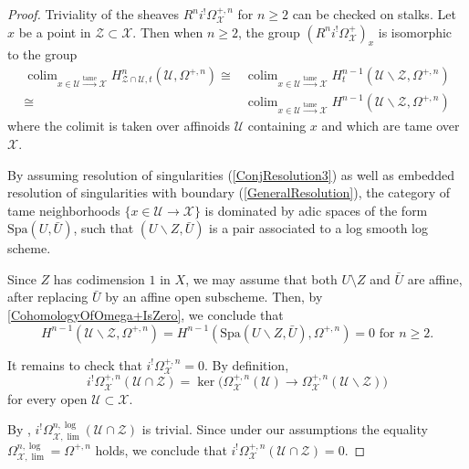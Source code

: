 \documentclass{amsart}
\def\Spa{\textrm{Spa}}
\theoremstyle{definition}
\DeclareMathOperator*{\colim}{\mathrm{colim}}
\numberwithin{equation}{section}
\begin{document}
\begin{proof}
	Triviality of the sheaves $R^ni^!\Omega^{+,n}_{\mathcal{X}}$ for $n\geq 2$ can be checked on stalks. Let $x$ be a point in $\mathcal{Z}\subset\mathcal{X}$. Then when $n\geq 2$, the group $(R^ni^!\Omega^+_{\mathcal{X}})_x$ is isomorphic to the group
	\[
	\begin{split}
		\colim_{x\in\mathcal{U}\xrightarrow{\textrm{tame}} \mathcal{X}}H^n_{\mathcal{Z}\cap \mathcal{U}, t}(\mathcal{U},\Omega^{+,n})\cong &\colim_{x\in \mathcal{U}\xrightarrow{\textrm{tame}} \mathcal{X}}H^{n-1}_{t}(\mathcal{U}\backslash\mathcal{Z},\Omega^{+,n})\\ \cong&\colim_{x\in \mathcal{U}\xrightarrow{\textrm{tame}} \mathcal{X}}H^{n-1}(\mathcal{U}\backslash\mathcal{Z},\Omega^{+,n}) 
	\end{split}
\]
	where the colimit is taken over affinoids $\mathcal{U}$ containing $x$ and which are tame over $\mathcal{X}$.
	
	By assuming resolution of singularities (\cref{ConjResolution3}) as well as embedded resolution of singularities with boundary (\cref{GeneralResolution}), the category of tame neighborhoods $\{x\in \mathcal{U}\to \mathcal{X}\}$ is dominated by adic spaces of the form $\Spa(U,\bar{U})$, such that $(U\backslash Z,\bar{U})$ is a pair associated to a log smooth log scheme.
	
	
	 Since $Z$ has codimension $1$ in $X$, we may assume that both \( U \setminus Z \) and \( \bar{U} \) are affine, after replacing \( \bar{U} \) by an affine open subscheme. Then, by \cref{CohomologyOfOmega+IsZero}, we conclude that
	 $$H^{n-1}(\mathcal{U}\backslash \mathcal{Z},\Omega^{+,n})= H^{n-1}(\Spa(U \backslash Z,\bar{U}),\Omega^{+,n})=0 \textrm{ for } n\geq 2.$$
	 
	 It remains to check that \( i^! \Omega^{+,n}_{\mathcal{X}} = 0 \). By definition,
	 \[
	 i^! \Omega^{+,n}_{\mathcal{X}}(\mathcal{U}\cap \mathcal{Z})=\ker \big(\Omega^{+,n}_{\mathcal{X}}(\mathcal{U})\to  \Omega^{+,n}_{\mathcal{X}}(\mathcal{U}\backslash \mathcal{Z})\big)
	 \]
	 for every open $\mathcal{U}\subset \mathcal{X}$.
	
	By \cite[Lemma 8.8]{LogDiff}, $i^! \Omega^{n,\log}_{\mathcal{X},\lim}(\mathcal{U}\cap \mathcal{Z})$ is trivial. Since under our assumptions the equality \( \Omega^{n,\log}_{\mathcal{X}, \lim} = \Omega^{+,n} \) holds, we conclude that \( i^! \Omega^{+,n}_{\mathcal{X}}(\mathcal{U} \cap \mathcal{Z}) = 0 \).
\end{proof}
\end{document}
